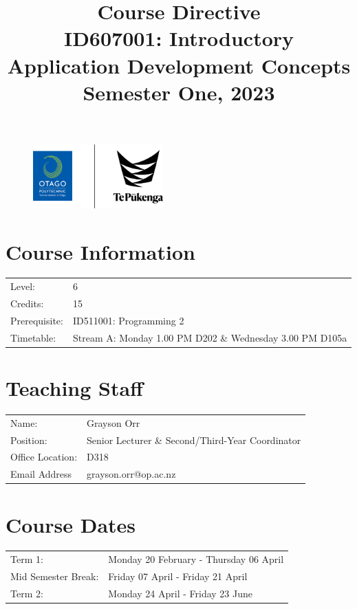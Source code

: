 \documentclass{article}
\author{}
\begin{document}
\begin{figure}
	\centering
	\includegraphics[width=50mm]{../img/logo.png}
\end{figure}

\title{Course Directive\\ID607001: Introductory Application Development Concepts\\Semester One, 2023}
\date{}
\maketitle

\section*{Course Information}
\begin{tabular}{ll}
	Level:        & 6 \\
	Credits:      & 15                                                             \\
	Prerequisite: & ID511001: Programming 2                                                   \\
	Timetable:    & Stream A: Monday 1.00 PM D202 \& Wednesday 3.00 PM D105a  \\
\end{tabular}

\section*{Teaching Staff}
\begin{tabular}{ll}
	Name:            & Grayson Orr                           \\
	Position:        & Senior Lecturer \& Second/Third-Year Coordinator\\
	Office Location: & D318                                 \\
	Email Address    & grayson.orr@op.ac.nz                    \\
\end{tabular}

\section*{Course Dates}
\begin{tabular}{ll}
	Term 1:             &  Monday 20 February - Thursday 06 April \\
	Mid Semester Break: &  Friday 07 April - Friday 21 April     \\
	Term 2:             &  Monday 24 April - Friday 23 June      \\
\end{tabular}
\end{document}
